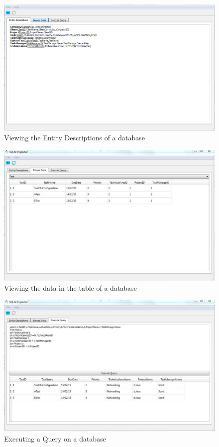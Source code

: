 \begin{figure}[H]
    \includegraphics[width=\textwidth]{./Maintenance/SQLite_Inspector_Entitydesc_Example.pdf}
    \caption{Viewing the Entity Descriptions of a database} \label{fig:SQLite Inspector Entity Descriptions}
\end{figure}
\begin{figure}[H]
    \includegraphics[width=\textwidth]{./Maintenance/SQLite_Inspector_Viewtable_Example.pdf}
    \caption{Viewing the data in the table of a database} \label{fig:SQLite Inspector Table Data}
\end{figure}
\begin{figure}[H]
    \includegraphics[width=\textwidth]{./Maintenance/SQLite_Inspector_Query_Example.pdf}
    \caption{Executing a Query on a database} \label{fig:SQLite Inspector Query}
\end{figure}

